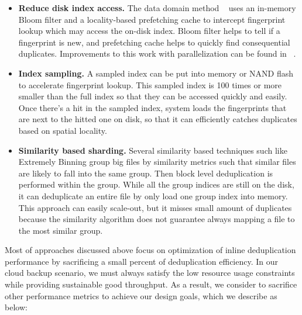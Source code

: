 \begin{itemize}
\item \textbf{Reduce disk index access.} The data domain method ~\cite{bottleneck08} 
uses an in-memory Bloom filter and a locality-based prefetching cache to intercept fingerprint lookup which may
access the on-disk index. Bloom filter\cite{Bonomi2006} helps to tell if a fingerprint is new, and prefetching cache
helps to quickly find consequential duplicates. Improvements to this work with parallelization can be found
 in ~\cite{MAD210,DEBAR,nath08}.
\item \textbf{Index sampling.} A sampled index can be 
put into memory\cite{sparseindex09} or NAND flash\cite{Guo2011} to accelerate fingerprint lookup. 
This sampled index is 100 times or more smaller than the full index so that 
they can be accessed quickly and easily.
Once there's a hit in the sampled index, system loads the fingerprints that are next to the hitted one on disk,
so that it can efficiently catches duplicates based on spatial locality.
\item \textbf{Similarity based sharding.} Several similarity based techniques\cite{shingling97} such like 
Extremely Binning\cite{extreme_binning09, Dong2011, Srinivasan2012, chord01} group big files by similarity metrics
such that similar files are likely to fall into the same group. Then block level deduplication is performed
within the group. While all the group indices are still on the disk, it can deduplicate an entire file
by only load one group index into memory. This approach can easily scale-out, but it misses small amount of duplicates 
because the similarity algorithm does not guarantee always mapping a file to the most similar group.
\end{itemize}

Most of approaches discussed above focus on optimization of inline deduplication
performance by sacrificing a small percent of deduplication efficiency.
In our cloud backup scenario, we must always satisfy the low resource usage constraints while 
providing sustainable good throughput. As a result, we consider to sacrifice other performance metrics 
to achieve our design goals, which we describe as below:

